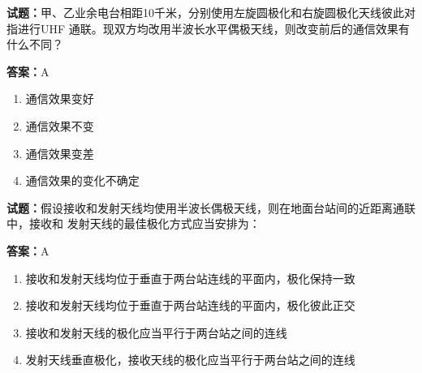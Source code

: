 \documentclass{ctexbook}
\begin{document}




\vspace{1em}

\textbf{试题：}甲、乙业余电台相距10千米，分别使用左旋圆极化和右旋圆极化天线彼此对指进行UHF
通联。现双方均改用半波长水平偶极天线，则改变前后的通信效果有什么不同？ 

\textbf{答案：}A 

\begin{enumerate}[leftmargin=3em]
  \item 通信效果变好 


  \item 通信效果不变 

  \item 通信效果变差 

  \item 通信效果的变化不确定 

\end{enumerate}





\vspace{1em}

\textbf{试题：}假设接收和发射天线均使用半波长偶极天线，则在地面台站间的近距离通联中，接收和
发射天线的最佳极化方式应当安排为： 

\textbf{答案：}A 

\begin{enumerate}[leftmargin=3em]
  \item 接收和发射天线均位于垂直于两台站连线的平面内，极化保持一致 

  \item 接收和发射天线均位于垂直于两台站连线的平面内，极化彼此正交 

  \item 接收和发射天线的极化应当平行于两台站之间的连线 

  \item 发射天线垂直极化，接收天线的极化应当平行于两台站之间的连线 

\end{enumerate}





\vspace{1em}
\end{document}
